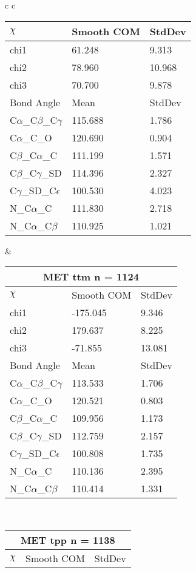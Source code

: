 \begin{longtable}{ c c }
\begin{tabular}{ l l l }
  $\chi$       & Smooth COM & StdDev \\ \midrule
  chi1 & 61.248 & 9.313 \\ 
  chi2 & 78.960 & 10.968 \\ 
  chi3 & 70.700 & 9.878 \\ \midrule
  Bond Angle   & Mean     & StdDev \\ \midrule
  C$\alpha$\_C$\beta$\_C$\gamma$ & 115.688 & 1.786\\
  C$\alpha$\_C\_O & 120.690 & 0.904\\
  C$\beta$\_C$\alpha$\_C & 111.199 & 1.571\\
  C$\beta$\_C$\gamma$\_SD & 114.396 & 2.327\\
  C$\gamma$\_SD\_C$\epsilon$ & 100.530 & 4.023\\
  N\_C$\alpha$\_C & 111.830 & 2.718\\
  N\_C$\alpha$\_C$\beta$ & 110.925 & 1.021\\
  \bottomrule
  \end{tabular}
  &
  \begin{tabular}{ l l l }
  \toprule
  \multicolumn{3}{c}{MET \textbf{ttm} n = 1124} \\ \toprule
  $\chi$       & Smooth COM & StdDev \\ \midrule
  chi1 & -175.045 & 9.346 \\ 
  chi2 & 179.637 & 8.225 \\ 
  chi3 & -71.855 & 13.081 \\ \midrule
  Bond Angle   & Mean     & StdDev \\ \midrule
  C$\alpha$\_C$\beta$\_C$\gamma$ & 113.533 & 1.706\\
  C$\alpha$\_C\_O & 120.521 & 0.803\\
  C$\beta$\_C$\alpha$\_C & 109.956 & 1.173\\
  C$\beta$\_C$\gamma$\_SD & 112.759 & 2.157\\
  C$\gamma$\_SD\_C$\epsilon$ & 100.808 & 1.735\\
  N\_C$\alpha$\_C & 110.136 & 2.395\\
  N\_C$\alpha$\_C$\beta$ & 110.414 & 1.331\\
  \bottomrule
  \end{tabular}
  \\
  \begin{tabular}{ l l l }
  \toprule
  \multicolumn{3}{c}{MET \textbf{tpp} n = 1138} \\ \toprule
  $\chi$       & Smooth COM & StdDev \\ \midrule

\end{tabular}
\end{longtable}
